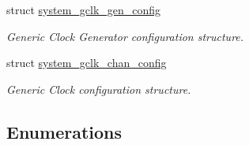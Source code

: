 \begin{DoxyCompactItemize}
struct \mbox{\hyperlink{structsystem__gclk__gen__config}{system\+\_\+gclk\+\_\+gen\+\_\+config}}
\begin{DoxyCompactList}\small\item\em Generic Clock Generator configuration structure. \end{DoxyCompactList}\item 
struct \mbox{\hyperlink{structsystem__gclk__chan__config}{system\+\_\+gclk\+\_\+chan\+\_\+config}}
\begin{DoxyCompactList}\small\item\em Generic Clock configuration structure. \end{DoxyCompactList}\end{DoxyCompactItemize}
\subsection*{Enumerations}
